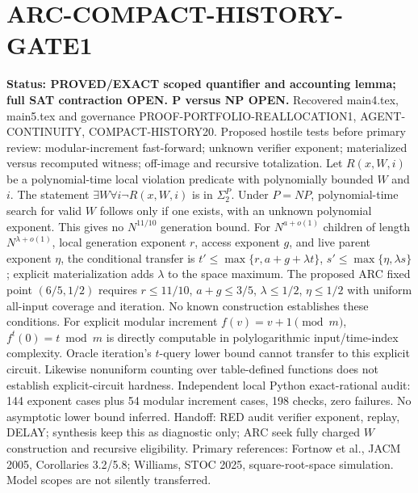 \documentclass{article}
\begin{document}
\section*{ARC-COMPACT-HISTORY-GATE1}
\textbf{Status: PROVED/EXACT scoped quantifier and accounting lemma; full SAT contraction OPEN. P versus NP OPEN.}
Recovered main4.tex, main5.tex and governance PROOF-PORTFOLIO-REALLOCATION1, AGENT-CONTINUITY, COMPACT-HISTORY20.
Proposed hostile tests before primary review: modular-increment fast-forward; unknown verifier exponent; materialized versus recomputed witness; off-image and recursive totalization.
Let $R(x,W,i)$ be a polynomial-time local violation predicate with polynomially bounded $W$ and $i$. The statement $\exists W\forall i\neg R(x,W,i)$ is in $\Sigma_2^P$. Under $P=NP$, polynomial-time search for valid $W$ follows only if one exists, with an unknown polynomial exponent. This gives no $N^{11/10}$ generation bound.
For $N^{a+o(1)}$ children of length $N^{\lambda+o(1)}$, local generation exponent $r$, access exponent $g$, and live parent exponent $\eta$, the conditional transfer is $t'\le\max\{r,a+g+\lambda t\}$, $s'\le\max\{\eta,\lambda s\}$; explicit materialization adds $\lambda$ to the space maximum. The proposed ARC fixed point $(6/5,1/2)$ requires $r\le11/10$, $a+g\le3/5$, $\lambda\le1/2$, $\eta\le1/2$ with uniform all-input coverage and iteration. No known construction establishes these conditions.
For explicit modular increment $f(v)=v+1\pmod m$, $f^t(0)=t\bmod m$ is directly computable in polylogarithmic input/time-index complexity. Oracle iteration's $t$-query lower bound cannot transfer to this explicit circuit. Likewise nonuniform counting over table-defined functions does not establish explicit-circuit hardness.
Independent local Python exact-rational audit: 144 exponent cases plus 54 modular increment cases, 198 checks, zero failures. No asymptotic lower bound inferred.
Handoff: RED audit verifier exponent, replay, DELAY; synthesis keep this as diagnostic only; ARC seek fully charged $W$ construction and recursive eligibility.
Primary references: Fortnow et al., JACM 2005, Corollaries 3.2/5.8; Williams, STOC 2025, square-root-space simulation. Model scopes are not silently transferred.
\end{document}
